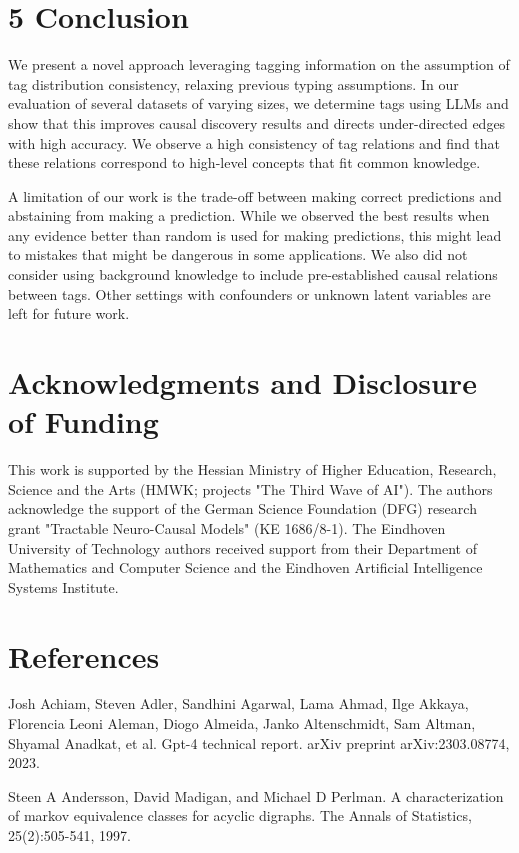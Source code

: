 \documentclass[10pt]{article}
\begin{document}
\section*{5 Conclusion}
We present a novel approach leveraging tagging information on the assumption of tag distribution consistency, relaxing previous typing assumptions. In our evaluation of several datasets of varying sizes, we determine tags using LLMs and show that this improves causal discovery results and directs under-directed edges with high accuracy. We observe a high consistency of tag relations and find that these relations correspond to high-level concepts that fit common knowledge.

A limitation of our work is the trade-off between making correct predictions and abstaining from making a prediction. While we observed the best results when any evidence better than random is used for making predictions, this might lead to mistakes that might be dangerous in some applications. We also did not consider using background knowledge to include pre-established causal relations between tags. Other settings with confounders or unknown latent variables are left for future work.

\section*{Acknowledgments and Disclosure of Funding}
This work is supported by the Hessian Ministry of Higher Education, Research, Science and the Arts (HMWK; projects "The Third Wave of AI"). The authors acknowledge the support of the German Science Foundation (DFG) research grant "Tractable Neuro-Causal Models" (KE 1686/8-1). The Eindhoven University of Technology authors received support from their Department of Mathematics and Computer Science and the Eindhoven Artificial Intelligence Systems Institute.

\section*{References}
Josh Achiam, Steven Adler, Sandhini Agarwal, Lama Ahmad, Ilge Akkaya, Florencia Leoni Aleman, Diogo Almeida, Janko Altenschmidt, Sam Altman, Shyamal Anadkat, et al. Gpt-4 technical report. arXiv preprint arXiv:2303.08774, 2023.

Steen A Andersson, David Madigan, and Michael D Perlman. A characterization of markov equivalence classes for acyclic digraphs. The Annals of Statistics, 25(2):505-541, 1997.
\end{document}
